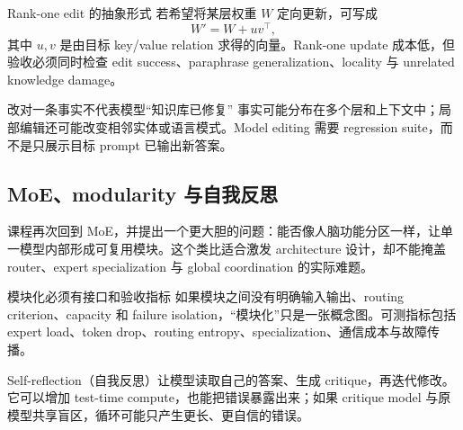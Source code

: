 
\begin{importantbox}{Rank-one edit 的抽象形式}
若希望将某层权重 $W$ 定向更新，可写成
\[
W' = W + uv^\top,
\]
其中 $u,v$ 是由目标 key/value relation 求得的向量。Rank-one update 成本低，但验收必须同时检查 edit success、paraphrase generalization、locality 与 unrelated knowledge damage。
\end{importantbox}

\begin{warningbox}{改对一条事实不代表模型“知识库已修复”}
事实可能分布在多个层和上下文中；局部编辑还可能改变相邻实体或语言模式。Model editing 需要 regression suite，而不是只展示目标 prompt 已输出新答案。
\end{warningbox}

\subsection{MoE、modularity 与自我反思}

课程再次回到 MoE，并提出一个更大胆的问题：能否像人脑功能分区一样，让单一模型内部形成可复用模块。这个类比适合激发 architecture 设计，却不能掩盖 router、expert specialization 与 global coordination 的实际难题。



\begin{warningbox}{模块化必须有接口和验收指标}
如果模块之间没有明确输入输出、routing criterion、capacity 和 failure isolation，“模块化”只是一张概念图。可测指标包括 expert load、token drop、routing entropy、specialization、通信成本与故障传播。
\end{warningbox}

Self-reflection（自我反思）让模型读取自己的答案、生成 critique，再迭代修改。它可以增加 test-time compute，也能把错误暴露出来；如果 critique model 与原模型共享盲区，循环可能只产生更长、更自信的错误。



